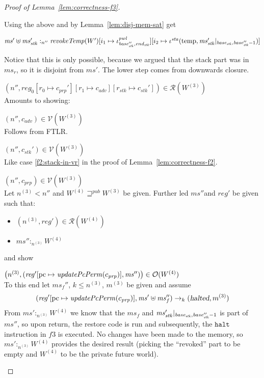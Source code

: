 \documentclass[a4paper]{article}
\newcommand{\update}[2]{[#1 \mapsto #2]}
\newcommand{\var}[1]{\mathit{#1}}
\newcommand{\hs}{\var{ms}}
\newcommand{\ms}{\hs}
\newcommand{\pcreg}{\mathrm{pc}}
\newcommand{\start}{\var{base}}
\newcommand{\addrend}{\var{end}}
\newcommand{\reg}{\var{reg}}
\newcommand{\heap}{\var{mem}}
\newcommand{\adv}{\var{adv}}
\newcommand{\stk}{\var{stk}}
\newcommand{\pwl}{\var{pwl}}
\newcommand{\sta}{\var{sta}}
\newcommand{\halted}{\textsl{halted}}
\newcommand{\plainfun}[2]{
  \ifthenelse{\equal{#2}{}}
  {\mathit{#1}}
  {\mathit{#1}(#2)}
}
\newcommand{\updatePcPerm}[1]{\plainfun{updatePcPerm}{#1}}
\newcommand{\revokeTemp}[1]{\plainfun{revokeTemp}{#1}}
\newcommand{\futurewk}{\mathbin{\sqsupseteq}^{\var{pub}}}
\newcommand{\heapSat}[3][\heap]{#1 :_{#2} #3}
\newcommand{\memSat}[3][n]{\heapSat[#2]{#1}{#3}}
\newcommand{\asmType}{\plaindom{AsmType}}
\newcommand{\plaindom}[1]{\mathrm{#1}}
\newcommand{\intr}[2]{\mathcal{#1}}
\newcommand{\valueintr}[1]{\intr{V}{#1}}
\newcommand{\regintr}[1]{\intr{R}{#1}}
\newcommand{\stdvr}{\valueintr{\asmType}}
\newcommand{\stdrr}{\regintr{\asmType}}
\newcommand{\observations}{\mathcal{O}}
\newcommand{\npair}[2][n]{\left(#1,#2 \right)}
\newcommand{\plainview}[1]{\mathrm{#1}}
\newcommand{\temp}{\plainview{temp}}
\newcommand{\step}[1][]{\rightarrow_{#1}}
\begin{document}
\begin{lemma}
\begin{proof}[Proof of Lemma~\ref{lem:correctness-f3}]
\begin{enumproof}[start=3]
\begin{enumproof}[start=3]
\begin{enumproof}[resume]
        Using the above and \label{f3:perm-mem-sat} by Lemma~\ref{lem:disj-mem-sat} get
        \begin{enumproof}
        \item $\memSat[n'']{\ms' \uplus \ms_\stk'}{\revokeTemp{W'}\update{i_1}{\iota^\pwl_{\base_\stk'',\addrend_\stk}}\update{i_2}{\iota^\sta (\temp,\ms_\stk' |_{\start_\stk,\base_\stk''-1})}}$ 
        \end{enumproof}
        Notice that this is only possible, because we argued that the stack part was in $\ms_r$, so it is disjoint from $\ms'$. The lower step comes from downwards closure.
      \item $\npair[n'']{\reg_0\update{r_0}{c_{\var{prp}}'}\update{r_1}{c_\adv}\update{r_\stk}{c_\stk'}} \in \stdrr(W^{(3)})$ \\
        Amounts to showing:
        \begin{enumproof}
        \item $\npair[n'']{c_\adv} \in \stdvr(W^{(3)})$\\
          Follows from FTLR.
        \item $\npair[n'']{c_\stk'} \in \stdvr(W^{(3)})$\\
          Like case \ref{f2:stack-in-vr} in the proof of Lemma~\ref{lem:correctness-f2}.
        \item $\npair[n'']{c_{\var{prp}}} \in \stdvr(W^{(3)})$\\
          Let $n^{(3)} < n''$ and $W^{(4)} \futurewk W^{(3)}$ be given. Further led $\ms''$and $\reg'$ be given such that:
          \begin{itemize}
          \item $\npair[n^{(3)}]{\reg'} \in \stdrr(W^{(4)})$
          \item $\memSat[n^{(3)}]{\ms''}{W^{(4)}}$
          \end{itemize}
          and show
          \begin{enumproof}
          \item $\npair[n^{(3)}]{(\reg'\update{\pcreg}{\updatePcPerm{c_{\var{prp}}}},\ms'')} \in \observations(W^{(4)})$\\
            To this end let $\ms_f''$, $k \leq n^{(3)}$, $m^{(3)}$ be given and assume
            \[
              (\reg'\update{\pcreg}{\updatePcPerm{c_{\var{prp}}}},\ms' \uplus \ms_f'') \step[k] (\halted,m^{(3)})
            \]
            From $\memSat[n^{(3)}]{\ms'}{W^{(4)}}$ we know that the $\ms_f$ and $\ms_\stk' |_{\base_\stk,\base_\stk''-1}$ is part of $\ms''$, so upon return, the restore code is run and subsequently, the $\mathtt{halt}$ instruction in $f3$ is executed. No changes have been made to the memory, so $\memSat[n^{(3)}]{\ms'}{W^{(4)}}$ provides the desired result (picking the ``revoked'' part to be empty and $W^{(4)}$ to be the private future world). 

\end{enumproof}
\end{enumproof}
\end{enumproof}
\end{enumproof}
\end{enumproof}
\end{proof}
\end{lemma}
\end{document}
